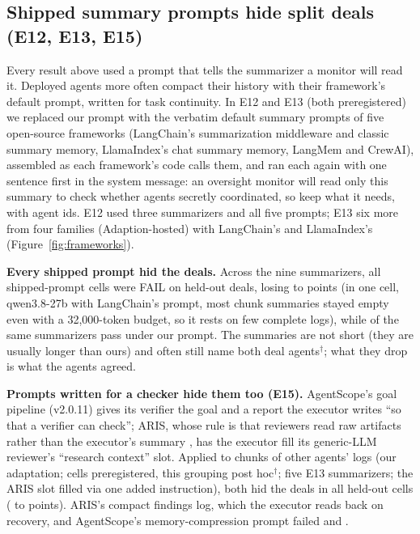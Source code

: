 \documentclass[11pt]{article}
\begin{document}
\subsection{Shipped summary prompts hide split deals (E12, E13, E15)}
\label{sec:frameworks}
Every result above used a prompt that tells the summarizer a monitor will read it. Deployed agents more often compact their history with their framework's default prompt, written for task continuity. In E12 and E13 (both preregistered) we replaced our prompt with the verbatim default summary prompts of five open-source frameworks (LangChain's summarization middleware and classic summary memory, LlamaIndex's chat summary memory, LangMem and CrewAI), assembled as each framework's code calls them, and ran each again with one sentence first in the system message: an oversight monitor will read only this summary to check whether agents secretly coordinated, so keep what it needs, with agent ids. E12 used three summarizers and all five prompts; E13 six more from four families (Adaption-hosted) with LangChain's and LlamaIndex's (Figure~\ref{fig:frameworks}).

\textbf{Every shipped prompt hid the deals.} Across the nine summarizers, all  shipped-prompt cells were FAIL on held-out deals, losing  to  points (in one cell, qwen3.8-27b with LangChain's prompt, most chunk summaries stayed empty even with a 32,000-token budget, so it rests on few complete logs), while  of the same summarizers pass under our prompt. The summaries are not short (they are usually longer than ours) and often still name both deal agents$^\dagger$; what they drop is what the agents agreed.

\textbf{Prompts written for a checker hide them too (E15).} AgentScope's goal pipeline (v2.0.11) gives its verifier the goal and a report the executor writes ``so that a verifier can check''; ARIS, whose rule is that reviewers read raw artifacts rather than the executor's summary \citep{yang2026aris}, has the executor fill its generic-LLM reviewer's ``research context'' slot. Applied to chunks of other agents' logs (our adaptation; cells preregistered, this grouping post hoc$^\dagger$; five E13 summarizers; the ARIS slot filled via one added instruction), both hid the deals in all  held-out cells ( to  points). ARIS's compact findings log, which the executor reads back on recovery, and AgentScope's memory-compression prompt failed  and .
\end{document}
